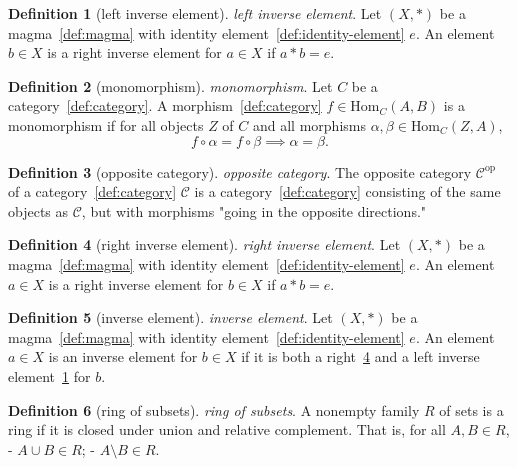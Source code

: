 \documentclass[12pt,a4paper]{article}
\theoremstyle{definition}
\newtheorem{definition}{Definition}
\begin{document}
\begin{definition}[left inverse element]\label{def:left-inverse-element}
\emph{left inverse element}. Let $(X,*)$ be a magma~\ref{def:magma} with identity element~\ref{def:identity-element} $e$. An element $b\in X$ is a right inverse element for $a\in X$ if $a * b=e$.
\end{definition}

\begin{definition}[monomorphism]\label{def:monomorphism}
\emph{monomorphism}. Let $C$ be a category~\ref{def:category}. A morphism~\ref{def:category} $f\in \text{Hom}_C(A,B)$ is a monomorphism if for all objects $Z$ of $C$ and all morphisms $\alpha,\beta\in \text{Hom}_C(Z,A)$, $$f\circ \alpha = f\circ \beta\implies \alpha = \beta.$$
\end{definition}

\begin{definition}[opposite category]\label{def:opposite-category}
\emph{opposite category}. The opposite category $\mathcal C^{\text{op}}$ of a category~\ref{def:category} $\mathcal C$ is a category~\ref{def:category} consisting of the same objects as $\mathcal C$, but with morphisms "going in the opposite directions."
\end{definition}

\begin{definition}[right inverse element]\label{def:right-inverse-element}
\emph{right inverse element}. Let $(X,*)$ be a magma~\ref{def:magma} with identity element~\ref{def:identity-element} $e$. An element $a\in X$ is a right inverse element for $b\in X$ if $a * b=e$.
\end{definition}

\begin{definition}[inverse element]\label{def:inverse-element}
\emph{inverse element}. Let $(X,*)$ be a magma~\ref{def:magma} with identity element~\ref{def:identity-element} $e$. An element $a\in X$ is an inverse element for $b\in X$ if it is both a right~\ref{def:right-inverse-element} and a left inverse element~\ref{def:left-inverse-element} for $b$.
\end{definition}

\begin{definition}[ring of subsets]\label{def:ring-of-subsets}
\emph{ring of subsets}. A nonempty family $R$ of sets is a ring if it is closed under union and relative complement. That is, for all $A, B \in R$, 
- $A\cup B \in R$; 
- $A\setminus B \in R$.
\end{definition}
\end{document}
